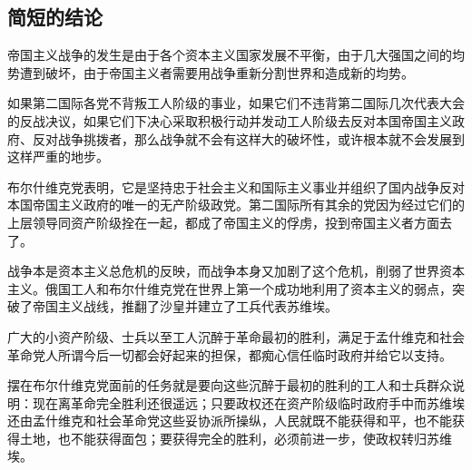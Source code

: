 \subsection{简短的结论}

帝国主义战争的发生是由于各个资本主义国家发展不平衡，由于几大强国之间的均势遭到破坏，由于帝国主义者需要用战争重新分割世界和造成新的均势。

如果第二国际各党不背叛工人阶级的事业，如果它们不违背第二国际几次代表大会的反战决议，如果它们下决心采取积极行动并发动工人阶级去反对本国帝国主义政府、反对战争挑拨者，那么战争就不会有这样大的破坏性，或许根本就不会发展到这样严重的地步。

布尔什维克党表明，它是坚持忠于社会主义和国际主义事业并组织了国内战争反对本国帝国主义政府的唯一的无产阶级政党。第二国际所有其余的党因为经过它们的上层领导同资产阶级拴在一起，都成了帝国主义的俘虏，投到帝国主义者方面去了。

战争本是资本主义总危机的反映，而战争本身又加剧了这个危机，削弱了世界资本主义。俄国工人和布尔什维克党在世界上第一个成功地利用了资本主义的弱点，突破了帝国主义战线，推翻了沙皇并建立了工兵代表苏维埃。

广大的小资产阶级、士兵以至工人沉醉于革命最初的胜利，满足于孟什维克和社会革命党人所谓今后一切都会好起来的担保，都痴心信任临时政府并给它以支持。

摆在布尔什维克党面前的任务就是要向这些沉醉于最初的胜利的工人和士兵群众说明：现在离革命完全胜利还很遥远；只要政权还在资产阶级临时政府手中而苏维埃还由孟什维克和社会革命党这些妥协派所操纵，人民就既不能获得和平，也不能获得土地，也不能获得面包；要获得完全的胜利，必须前进一步，使政权转归苏维埃。


